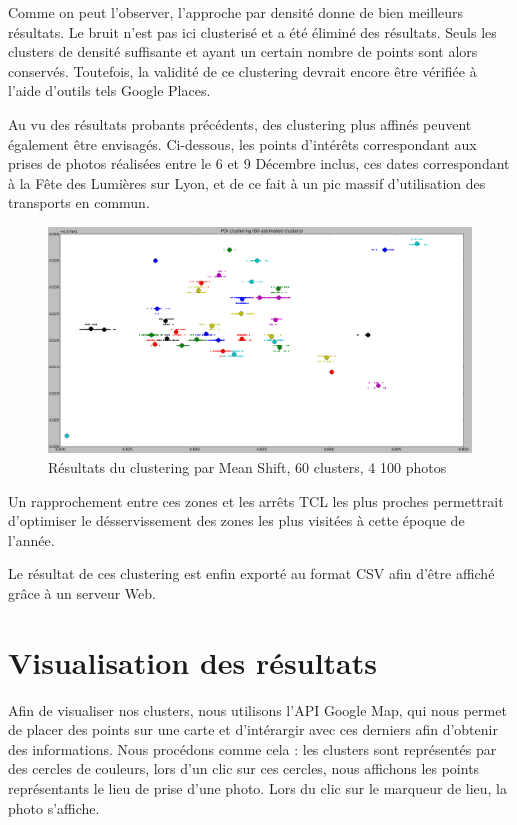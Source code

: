 Comme on peut l'observer, l'approche par densité donne de bien meilleurs résultats. Le bruit n'est pas ici clusterisé et a été éliminé des résultats. Seuls les clusters de densité suffisante et ayant un certain nombre de points sont alors conservés. Toutefois, la validité de ce clustering devrait encore être vérifiée à l'aide d'outils tels Google Places.


Au vu des résultats probants précédents, des clustering plus affinés peuvent également être envisagés. Ci-dessous, les points d'intérêts correspondant aux prises de photos réalisées entre le 6 et 9 Décembre inclus, ces dates correspondant à la Fête des Lumières sur Lyon, et de ce fait à un pic massif d'utilisation des transports en commun.
\begin{figure}[H]
    \centering
    \includegraphics[width=\linewidth]{img/meanshift_lumieres.png}
    \caption{Résultats du clustering par Mean Shift, 60 clusters, 4 100 photos}
\end{figure}

Un rapprochement entre ces zones et les arrêts TCL les plus proches permettrait d'optimiser le désservissement des zones les plus visitées à cette époque de l'année.

Le résultat de ces clustering est enfin exporté au format CSV afin d'être affiché grâce à un serveur Web.
\pagebreak



\section{Visualisation des résultats}

Afin de visualiser nos clusters, nous utilisons l'API Google Map, qui nous permet de placer des points sur une carte et d'intérargir avec ces derniers afin d'obtenir des informations.
Nous procédons comme cela : les clusters sont représentés par des cercles de couleurs, lors d'un clic sur ces cercles, nous affichons les points représentants le lieu de prise d'une photo. Lors du clic sur le marqueur de lieu, la photo s'affiche.


